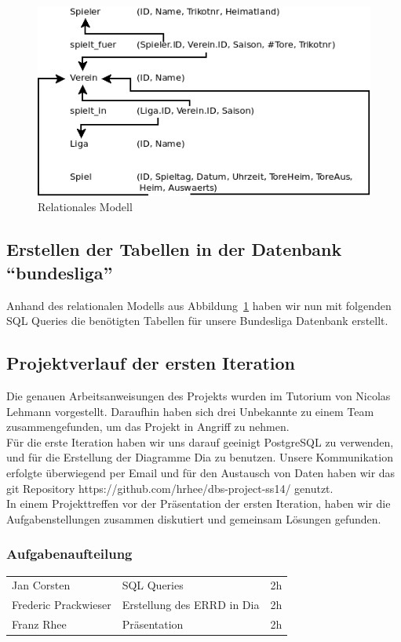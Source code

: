 \documentclass[
10pt,
a4paper
]{scrartcl}
\begin{document}
\begin{figure}[h]
	\centering
  \includegraphics[scale=0.43]{relat.png}
	\caption{Relationales Modell }
	\label{fig3}
\end{figure}

\subsection{Erstellen der Tabellen in der Datenbank “bundesliga”}
Anhand des relationalen Modells aus Abbildung~\ref{fig3} haben wir nun mit folgenden SQL Queries die benötigten Tabellen für unsere Bundesliga Datenbank erstellt.
 


\subsection{Projektverlauf der ersten Iteration}

Die genauen Arbeitsanweisungen des Projekts wurden im Tutorium von Nicolas Lehmann vorgestellt. Daraufhin haben sich drei Unbekannte  zu einem Team zusammengefunden, um das Projekt in Angriff zu nehmen.\\
Für die erste Iteration haben wir uns darauf geeinigt PostgreSQL zu verwenden, und für die Erstellung der Diagramme Dia zu benutzen. Unsere Kommunikation erfolgte überwiegend per Email und für den Austausch von Daten haben wir das git  Repository https://github.com/hrhee/dbs-project-ss14/ genutzt.\\
In einem Projekttreffen vor der Präsentation der ersten Iteration, haben wir die Aufgabenstellungen zusammen diskutiert und gemeinsam Lösungen gefunden.

\subsubsection{Aufgabenaufteilung}
\begin{tabular}{ l l c }
Jan Corsten & SQL Queries &  2h \\
Frederic Prackwieser & Erstellung des ERRD in Dia  & 2h \\
Franz Rhee & Präsentation & 2h \\
\end{tabular}
\end{document}
